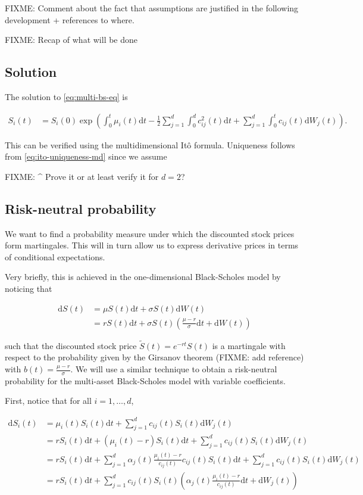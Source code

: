 \documentclass[a4paper]{article}
\begin{document}
FIXME: Comment about the fact that assumptions are justified in the following development + references to where.

FIXME: Recap of what will be done

\subsection{Solution}

The solution to \eqref{eq:multi-bs-eq} is

\begin{align*}
  S_i(t) &= S_i(0) \exp \left( \int_0^t \mu_i(t) \mathrm{d}t - \frac{1}{2} \sum_{j=1}^{d} \int_0^d c_{ij}^2(t) \mathrm{d}t + \sum_{j=1}^d \int_0^t c_{ij}(t) \mathrm{d}W_j(t) \right).
\end{align*}

This can be verified using the multidimensional It\^o formula. Uniqueness follows from \eqref{eq:ito-uniqueness-md} since we assume

FIXME: \^{} Prove it or at least verify it for $d=2$?

\pagebreak
\subsection{Risk-neutral probability}

We want to find a probability measure under which the discounted stock prices form martingales. This will in turn allow us to express derivative prices in terms of conditional expectations.

Very briefly, this is achieved in the one-dimensional Black-Scholes model by noticing that

\begin{align*}
  \mathrm{d}S(t)
  &= \mu S(t) \mathrm{d}t + \sigma S(t) \mathrm{d}W(t)\\
  &= r S(t) \mathrm{d}t + \sigma S(t) \left(\frac{\mu - r}{\sigma} \mathrm{d}t + \mathrm{d}W(t)\right)
\end{align*}

such that the discounted stock price $\tilde{S}(t) = e^{-rt}S(t)$ is a martingale with respect to the probability given by the Girsanov theorem (FIXME: add reference) with $b(t) = \frac{\mu - r}{\sigma}$. We will use a similar technique to obtain a risk-neutral probability for the multi-asset Black-Scholes model with variable coefficients.

First, notice that for all $i=1,\ldots,d$,

\begin{align*}
  \mathrm{d}S_i(t)
  &= \mu_i(t) S_i(t) \mathrm{d}t + \sum_{j=1}^{d} c_{ij}(t) S_i(t) \mathrm{d}W_j(t)\\
  &= r S_i(t) \mathrm{d}t + (\mu_i(t) - r) S_i(t) \mathrm{d}t + \sum_{j=1}^{d} c_{ij}(t) S_i(t) \mathrm{d}W_j(t)\\
  &= r S_i(t) \mathrm{d}t + \sum_{j=1}^{d} \alpha_j(t) \frac{\mu_i(t) - r}{c_{ij}(t)} c_{ij}(t) S_i(t) \mathrm{d}t + \sum_{j=1}^{d} c_{ij}(t) S_i(t) \mathrm{d}W_j(t)\\
  &= r S_i(t) \mathrm{d}t + \sum_{j=1}^{d} c_{ij}(t) S_i(t) \left(\alpha_j(t) \frac{\mu_i(t) - r}{c_{ij}(t)} \mathrm{d}t + \mathrm{d}W_j(t)\right)
\end{align*}
\end{document}
